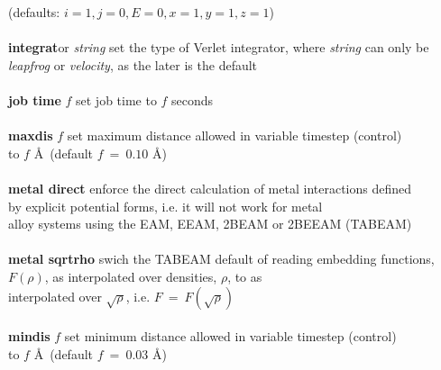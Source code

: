 \begin{tabbing}
\>                                              \> (defaults: $i = 1, j = 0, E = 0, x = 1, y = 1, z = 1$) \\
\>                                              \> \\
\> {\bf integrat}or {\em string}                \> set the type of Verlet integrator, where {\em string} can only be \\
\>                                              \> {\em leapfrog} or {\em velocity}, as the later is the default \\
\>                                              \> \\
\> {\bf job time} $f$                           \> set job time to $f$ seconds \\
\>                                              \> \\
\> {\bf maxdis} $f$                             \> set maximum distance allowed in variable timestep (control) \\
\>                                              \> to $f$ \AA~(default $f~=~0.10$ \AA) \\
\>                                              \> \\
\> {\bf metal direct}                           \> enforce the direct calculation of metal interactions defined \\
\>                                              \> by explicit potential forms, i.e. it will not work for metal \\
\>                                              \> alloy systems using the EAM, EEAM, 2BEAM or 2BEEAM (TABEAM) \\
\>                                              \> \\
\> {\bf metal sqrtrho}                          \> swich the TABEAM default of reading embedding functions, \\
\>                                              \> $F(\rho)$, as interpolated over densities, $\rho$, to as \\
\>                                              \> interpolated over $\sqrt{\rho}$, i.e. $F~=~F(\sqrt{\rho})$\\
\>                                              \> \\
\> {\bf mindis} $f$                             \> set minimum distance allowed in variable timestep (control) \\
\>                                              \> to $f$ \AA~(default $f~=~0.03$ \AA) \\

\end{tabbing}
